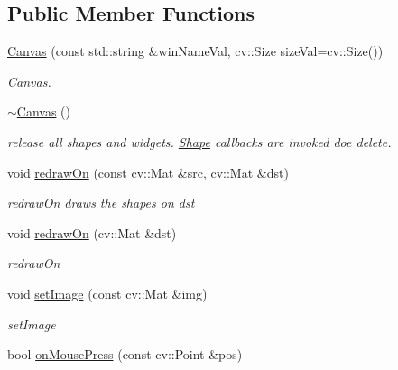 \subsection*{Public Member Functions}
\begin{DoxyCompactItemize}
\item 
\hyperlink{classcanvascv_1_1Canvas_a7049e8c687a2ac33331820d32f4f6464}{Canvas} (const std\+::string \&win\+Name\+Val, cv\+::\+Size size\+Val=cv\+::\+Size())
\begin{DoxyCompactList}\small\item\em \hyperlink{classcanvascv_1_1Canvas}{Canvas}. \end{DoxyCompactList}\item 
\hyperlink{classcanvascv_1_1Canvas_a178be13c77efe0d5768fb7ca09873711}{$\sim$\+Canvas} ()\hypertarget{classcanvascv_1_1Canvas_a178be13c77efe0d5768fb7ca09873711}{}\label{classcanvascv_1_1Canvas_a178be13c77efe0d5768fb7ca09873711}

\begin{DoxyCompactList}\small\item\em release all shapes and widgets. \hyperlink{classcanvascv_1_1Shape}{Shape} callbacks are invoked doe delete. \end{DoxyCompactList}\item 
void \hyperlink{classcanvascv_1_1Canvas_a018c66e277de7904b8146ea3f3feebdd}{redraw\+On} (const cv\+::\+Mat \&src, cv\+::\+Mat \&dst)
\begin{DoxyCompactList}\small\item\em redraw\+On draws the shapes on dst \end{DoxyCompactList}\item 
void \hyperlink{classcanvascv_1_1Canvas_a0eed02e6923d903c3af1bf6692ad87fe}{redraw\+On} (cv\+::\+Mat \&dst)
\begin{DoxyCompactList}\small\item\em redraw\+On \end{DoxyCompactList}\item 
void \hyperlink{classcanvascv_1_1Canvas_a441c5882c7ebebd454a306b3c3478ae7}{set\+Image} (const cv\+::\+Mat \&img)
\begin{DoxyCompactList}\small\item\em set\+Image \end{DoxyCompactList}\item 
bool \hyperlink{classcanvascv_1_1Canvas_abe53228080133efe5d9fecf6982b823e}{on\+Mouse\+Press} (const cv\+::\+Point \&pos)\hypertarget{classcanvascv_1_1Canvas_abe53228080133efe5d9fecf6982b823e}{}\label{classcanvascv_1_1Canvas_abe53228080133efe5d9fecf6982b823e}


\end{DoxyCompactItemize}
